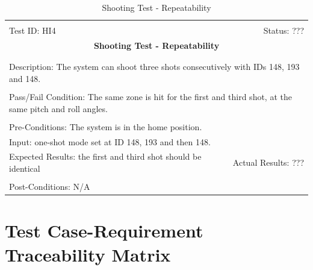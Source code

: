 \documentclass[11pt]{article}
\begin{document}
\begin{center}
\begin{table}[H]
\begin{tabular}{|l r|}\hline&\\[-2mm]
	Test ID: HI4	&Status: ???\\[-3mm]
	\multicolumn{2}{|c|}{\textbf{\large{Shooting Test - Repeatability}}}\\&\\\hline&\\[-3mm]
	\multicolumn{2}{|p{\textwidth}|}{Description: The system can shoot three shots consecutively with IDs 148, 193 and 148.}\\[1mm]\hline&\\[-3mm]
	\multicolumn{2}{|p{\textwidth}|}{Pass/Fail Condition: The same zone is hit for the first and third shot, at the same pitch and roll angles.}\\[1mm]\hline&\\[-3mm]
	\multicolumn{2}{|p{\textwidth}|}{Pre-Conditions: The system is in the home position.}\\[4mm]
	\multicolumn{2}{|p{\textwidth}|}{Input: one-shot mode set at ID 148, 193 and then 148.}\\[2mm]\hline
	\multicolumn{1}{|p{0.49\textwidth}}{Expected Results: the first and third shot should be identical}	&\multicolumn{1}{|p{0.45\textwidth}|}{Actual Results: ???}\\\hline&\\[-3mm]
	\multicolumn{2}{|p{\textwidth}|}{Post-Conditions: N/A}\\\hline
\end{tabular}
\caption{Shooting Test - Repeatability}
\end{table}
\end{center}

\section{Test Case-Requirement Traceability Matrix}
\end{document}
